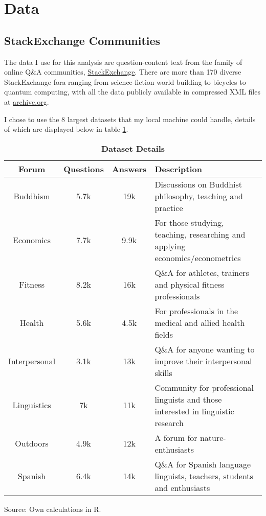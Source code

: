 \documentclass[12pt,preprint, authoryear]{article}
\numberwithin{equation}{section}
\numberwithin{figure}{section}
\numberwithin{table}{section}
\begin{document}
\newpage

\section{Data}\label{data}

\subsection{StackExchange Communities}\label{stackexchange-communities}

The data I use for this analysis are question-content text from the
family of online Q\&A communities,
\href{https://stackexchange.com/sites\#traffic}{StackExchange}. There
are more than 170 diverse StackExchange fora ranging from
science-fiction world building to bicycles to quantum computing, with
all the data publicly available in compressed XML files at
\href{http://archive.org/download/stackexchange}{archive.org}.

I chose to use the 8 largest datasets that my local machine could
handle, details of which are displayed below in table \ref{tab:fora}.

\renewcommand{\thetable}{\arabic{table}}

\footnotesize

\begin{longtable} {@{} cccp{12cm} @{}}
\caption{\textbf{Dataset Details}}
\label{tab:fora}\\ \hline \hline
Forum & Questions & Answers & Description \\ 
\hline
Buddhism & 5.7k & 19k & Discussions on Buddhist philosophy, teaching and practice \\
Economics & 7.7k & 9.9k & For those studying, teaching, researching and applying economics/econometrics \\
Fitness & 8.2k & 16k & Q\&A for athletes, trainers and physical fitness professionals \\ 
Health & 5.6k & 4.5k & For professionals in the medical and allied health fields \\ 
Interpersonal & 3.1k & 13k & Q\&A for anyone wanting to improve their interpersonal skills \\ 
Linguistics & 7k & 11k & Community for professional linguists and those interested in linguistic research \\
Outdoors & 4.9k & 12k & A forum for nature-enthusiasts \\ 
Spanish & 6.4k & 14k & Q\&A for Spanish language linguists, teachers, students and enthusiasts  \\
\hline \hline
\end{longtable}\begin{center} Source: Own calculations in R.\end{center}
\end{document}
